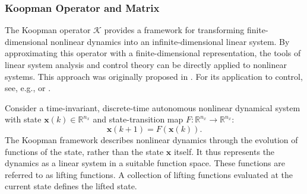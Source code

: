 \subsubsection{Koopman Operator and Matrix}\label{KoopmanOperator}

The Koopman operator $\mathcal{K}$ provides a framework for transforming finite-dimensional nonlinear dynamics into an infinite-dimensional linear system. By approximating this operator with a finite-dimensional representation, the tools of linear system analysis and control theory can be directly applied to nonlinear systems. This approach was originally proposed in \cite{koopman1931hamiltonian}. For its application to control, see, e.g., \cite{proctor2018generalizing} or \cite{kaiser2020data}.

Consider a time-invariant, discrete-time autonomous nonlinear dynamical
system with state $\bm{x}(k) \in \mathbb{R}^{n_x}$ and state-transition
map $F: \mathbb{R}^{n_x} \to \mathbb{R}^{n_x}$:
\begin{equation}
    \bm{x}(k+1) = F(\bm{x}(k)).
    \label{eq:nonLinSysKoop}
\end{equation}
%
The Koopman framework describes nonlinear dynamics through the evolution
of functions of the state, rather than the state $\bm{x}$ itself. It
thus represents the dynamics as a linear system in a suitable function
space. These functions are referred to as lifting functions. A collection of
lifting functions evaluated at the current state defines the lifted state.

